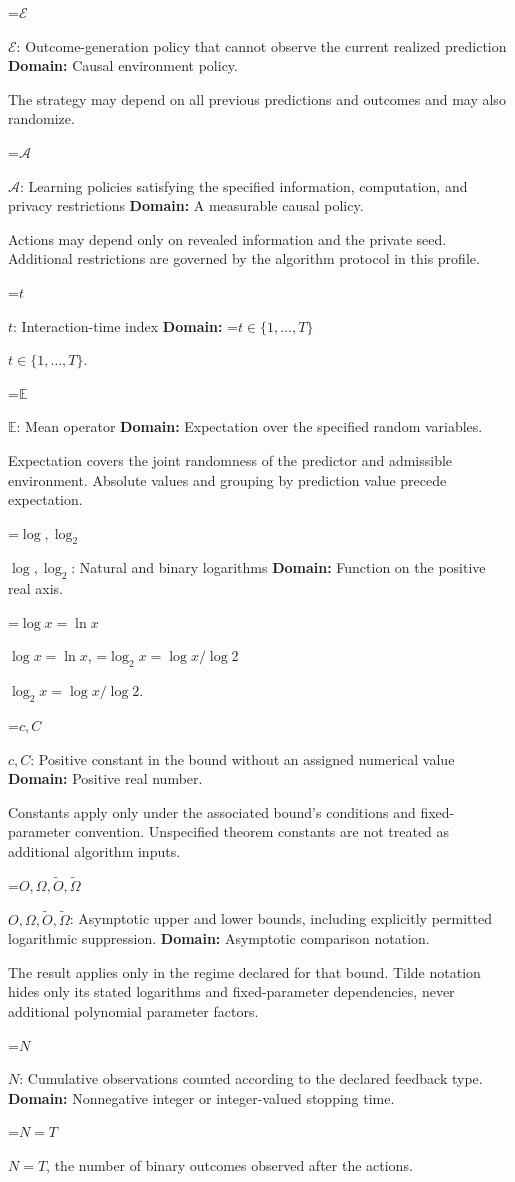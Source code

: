 \documentclass[10pt,a4paper]{article}
\newcommand{\AtlasMath}[1]{\par\begingroup\centering\setbox0=\hbox{$\displaystyle #1$}\ifdim\wd0>1.4\linewidth\typeout{ATLAS WIDE FORMULA: \the\wd0}\fi\ifdim\wd0>\linewidth\resizebox{\linewidth}{!}{\box0}\else\box0\fi\par\endgroup}
\newcommand{\AtlasInlineMath}[1]{\begingroup\setbox0=\hbox{$#1$}\ifdim\wd0>.4\linewidth\endgroup\AtlasMath{#1}\else\endgroup$#1$\fi}
\begin{document}
\AtlasInlineMath{\mathcal E}: Outcome-generation policy that cannot observe the current realized prediction \textbf{Domain:} Causal environment policy.

The strategy may depend on all previous predictions and outcomes and may also randomize.

\AtlasInlineMath{\mathcal A}: Learning policies satisfying the specified information, computation, and privacy restrictions \textbf{Domain:} A measurable causal policy.

Actions may depend only on revealed information and the private seed. Additional restrictions are governed by the algorithm protocol in this profile.

\AtlasInlineMath{t}: Interaction-time index \textbf{Domain:} \AtlasInlineMath{t\in\{1,\ldots,T\}}.

\AtlasInlineMath{\mathbb E}: Mean operator \textbf{Domain:} Expectation over the specified random variables.

Expectation covers the joint randomness of the predictor and admissible environment. Absolute values and grouping by prediction value precede expectation.

\AtlasInlineMath{\log,\log_2}: Natural and binary logarithms \textbf{Domain:} Function on the positive real axis.

\AtlasInlineMath{\log x=\ln x}, \AtlasInlineMath{\log_2x=\log x/\log2}.

\AtlasInlineMath{c,C}: Positive constant in the bound without an assigned numerical value \textbf{Domain:} Positive real number.

Constants apply only under the associated bound’s conditions and fixed-parameter convention. Unspecified theorem constants are not treated as additional algorithm inputs.

\AtlasInlineMath{O,\Omega,\widetilde O,\widetilde\Omega}: Asymptotic upper and lower bounds, including explicitly permitted logarithmic suppression. \textbf{Domain:} Asymptotic comparison notation.

The result applies only in the regime declared for that bound. Tilde notation hides only its stated logarithms and fixed-parameter dependencies, never additional polynomial parameter factors.

\AtlasInlineMath{N}: Cumulative observations counted according to the declared feedback type. \textbf{Domain:} Nonnegative integer or integer-valued stopping time.

\AtlasInlineMath{N=T}, the number of binary outcomes observed after the actions.
\end{document}
